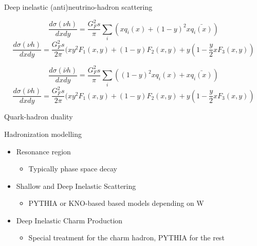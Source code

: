 \begin{frame}{Deep inelastic (anti)neutrino-hadron scattering}

 \begin{equation*}
    \frac{d\sigma({\nu}h)}{dxdy} = \frac{G_{F}^{2}s}{\pi} \sum_{i} (xq_{i}(x) + (1-y)^{2} x\bar{q_{i}(x)})
 \end{equation*}
 \begin{equation*}
    \frac{d\sigma({\nu}h)}{dxdy} = \frac{G_{F}^{2}s}{2\pi} (x y^{2} F_{1}(x,y) + (1-y) F_{2}(x,y) + y (1-\frac{y}{2} x F_{3}(x,y))
 \end{equation*}

 \begin{equation*}
    \frac{d\sigma(\bar{\nu}h)}{dxdy} = \frac{G_{F}^{2}s}{\pi} \sum_{i} ((1-y)^{2} xq_{i}(x) + x\bar{q_{i}(x)})
 \end{equation*}
 \begin{equation*}
    \frac{d\sigma(\bar{\nu}h)}{dxdy} = \frac{G_{F}^{2}s}{2\pi} (x y^{2} F_{1}(x,y) + (1-y) F_{2}(x,y) + y (1-\frac{y}{2} x F_{3}(x,y))
 \end{equation*}

\end{frame}



\begin{frame}{Quark-hadron duality}

\end{frame}


\begin{frame}{Hadronization modelling}

\begin{itemize}
\item Resonance region
  \begin{itemize}
     \item Typically phase space decay
  \end{itemize}  
\item Shallow and Deep Inelastic Scattering
  \begin{itemize}
     \item PYTHIA or KNO-based based models depending on W
  \end{itemize}  
\item Deep Inelastic Charm Production
  \begin{itemize}
     \item Special treatment for the charm hadron, PYTHIA for the rest
  \end{itemize}  
\end{itemize}
\end{frame}


